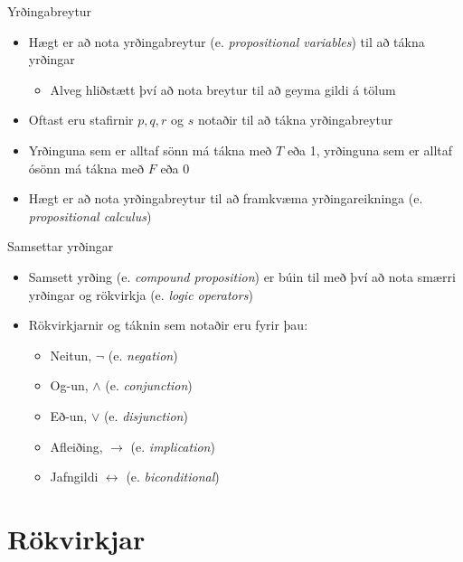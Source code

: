 \documentclass[handout]{beamer}
\begin{document}
\begin{frame}{Yrðingabreytur}
\begin{itemize}
 \item Hægt er að nota yrðingabreytur (e. \emph{propositional variables}) til að tákna yrðingar
 \begin{itemize}
  \item Alveg hliðstætt því að nota breytur til að geyma gildi á tölum
 \end{itemize}
 \item Oftast eru stafirnir $p, q, r$ og $s$ notaðir til að tákna yrðingabreytur
 \item Yrðinguna sem er alltaf sönn má tákna með $T$ eða 1, yrðinguna sem er alltaf ósönn má tákna með $F$ eða 0
 \item Hægt er að nota yrðingabreytur til að framkvæma yrðingareikninga (e. \emph{propositional calculus})
\end{itemize}
\end{frame}

\begin{frame}{Samsettar yrðingar}
\begin{itemize}
 \item Samsett yrðing (e. \emph{compound proposition}) er búin til með því að nota smærri yrðingar og rökvirkja (e. \emph{logic operators})
 \item Rökvirkjarnir og táknin sem notaðir eru fyrir þau:
 \begin{itemize}
  \item Neitun, $\lnot$ (e. \emph{negation})
  \item Og-un, $\land$ (e. \emph{conjunction})
  \item Eð-un, $\lor$ (e. \emph{disjunction})
  \item Afleiðing, $\to$ (e. \emph{implication})
  \item Jafngildi $\leftrightarrow$ (e. \emph{biconditional})
 \end{itemize}
\end{itemize}
\end{frame}

\section{Rökvirkjar}
\end{document}
